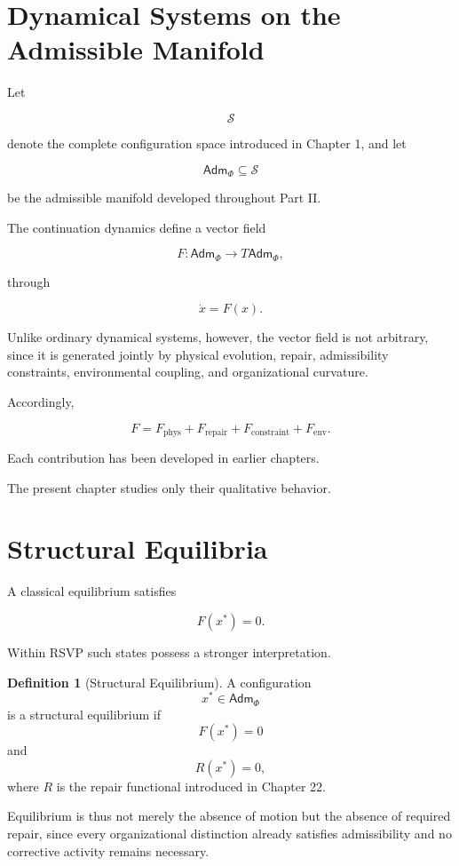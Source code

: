 \documentclass[11pt,oneside]{book}
\numberwithin{equation}{chapter}
\theoremstyle{definition}
\newtheorem{definition}{Definition}[chapter]
\theoremstyle{plain}
\newcommand{\State}{\mathcal{S}}
\newcommand{\Adm}{\mathsf{Adm}}
\begin{document}
\section{Dynamical Systems on the Admissible Manifold}

Let

\[
\State
\]

denote the complete configuration space introduced in Chapter 1, and let

\[
\Adm_\Phi
\subseteq
\State
\]

be the admissible manifold developed throughout Part II.

The continuation dynamics define a vector field

\[
F:
\Adm_\Phi
\rightarrow
T\Adm_\Phi,
\]

through

\[
\dot{x}
=
F(x).
\]

Unlike ordinary dynamical systems, however, the vector field is not arbitrary, since it is generated jointly by physical evolution, repair, admissibility constraints, environmental coupling, and organizational curvature.

Accordingly,

\[
F
=
F_{\mathrm{phys}}
+
F_{\mathrm{repair}}
+
F_{\mathrm{constraint}}
+
F_{\mathrm{env}}.
\]

Each contribution has been developed in earlier chapters.

The present chapter studies only their qualitative behavior.

\section{Structural Equilibria}

A classical equilibrium satisfies

\[
F(x^*) = 0.
\]

Within RSVP such states possess a stronger interpretation.

\begin{definition}[Structural Equilibrium]
A configuration
\[
x^*
\in
\Adm_\Phi
\]
is a structural equilibrium if
\[
F(x^*)=0
\]
and
\[
R(x^*)=0,
\]
where \(R\) is the repair functional introduced in Chapter 22.
\end{definition}

Equilibrium is thus not merely the absence of motion but the absence of required repair, since every organizational distinction already satisfies admissibility and no corrective activity remains necessary.
\end{document}
